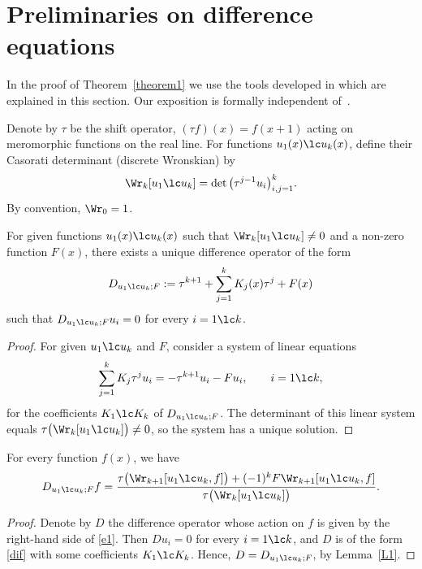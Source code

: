 \section{Preliminaries on difference equations}\label{section4}

In the proof of Theorem~\ref{theorem1} we use the tools developed in \cite{MTV} which are explained in this section. Our exposition is formally independent of~\cite{MTV}.

Denote by $\tau$ be the shift operator, $(\tau f)(x)=f(x+1)$ acting on meromorphic functions on the real line. For functions $u_1(x)\lc u_k(x)$, define their Casorati determinant (discrete Wronskian) by
\begin{gather*}
\Wr_k[u_1\lc u_k] = \det\big(\tau^{j-1}u_i\big)_{i,j=1}^k.
\end{gather*}
By convention, $\Wr_0=1$.
\begin{lem}\label{L1}
For given functions $u_1(x)\lc u_k(x)$ such that $\Wr_k[u_1\lc u_k]\ne 0$ and a non-zero function $F(x)$, there exists a unique difference operator of the form
\begin{gather}\label{dif}
D_{u_1\lc u_k;F}:=\tau^{k+1}+\sum_{j=1}^k K_j(x)\tau^j+F(x)
\end{gather}
such that $D_{u_1\lc u_k;F}u_i=0$ for every $i=1\lc k$.
\end{lem}

\begin{proof} For given $u_1\lc u_k$ and $F$, consider a system of linear equations
\begin{gather*}
\sum_{j=1}^kK_j \tau^ju_i=-\tau^{k+1}u_i-Fu_i,\qquad i=1\lc k,
\end{gather*}
for the coefficients $K_1\lc K_k$ of $D_{u_1\lc u_k;F}$. The determinant of this linear system equals $\tau\bigl(\Wr_k[u_1\lc u_k]\bigr)\ne 0$, so the system has a unique solution.
\end{proof}

\begin{lem}\label{L2}
For every function $f(x)$, we have
\begin{gather}
D_{u_1\lc u_k; F} f = \frac{\tau\bigl(\Wr_{k+1}[u_1\lc u_k,f]\bigr)+ (-1)^kF\Wr_{k+1}[u_1\lc u_k,f]}{\tau\bigl(\Wr_k[u_1\lc u_k]\bigr)}.\label{e1}
\end{gather}
\end{lem}

\begin{proof} Denote by $D$ the difference operator whose action on $f$ is given by the right-hand side of \eqref{e1}. Then $Du_i=0$ for every $i=1\lc k$, and $D$ is of the form \eqref{dif} with some coefficients $K_1\lc K_k$. Hence, $D=D_{u_1\lc u_k; F}$, by Lemma~\ref{L1}.
\end{proof}

